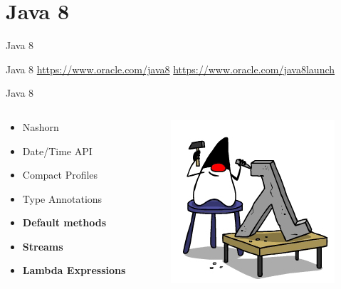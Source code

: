 \documentclass{beamer}
\begin{document}
\section{Java 8}
\begin{frame}
\huge Java 8
\end{frame}

\begin{frame}{Java 8}
\href{https://www.oracle.com/java8}{https://www.oracle.com/java8}
\href{https://www.oracle.com/java8launch}{https://www.oracle.com/java8launch}
\end{frame}

\begin{frame}{Java 8}
     \begin{columns}[T] %
	     \begin{column}[T]{5cm} %
				\begin{itemize}
				\item Nashorn
				\item Date/Time API
				\item Compact Profiles
				\item Type Annotations
				\item \textbf{Default methods}
				\item \textbf{Streams}
				\item \textbf{Lambda Expressions}
				\end{itemize}
	     \end{column}
	     \begin{column}[T]{5cm} %
			\begin{figure}
			\centering
			\includegraphics[width=0.7\linewidth]{Images/JavaLam-1}
			\end{figure}

	     \end{column}
     \end{columns}
\end{frame}
\end{document}
